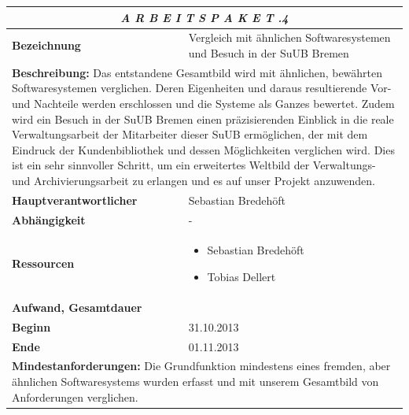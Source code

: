 \documentclass[fontsize=12pt,paper=a4,twoside]{scrartcl}
\begin{document}
\begin{tabular}{p{7.5cm}|p{7.5cm}}\toprule
\multicolumn{2}{c}{\textbf{\textit{A R B E I T S P A K E T \quad 2.1.4}}} \\ \toprule \hline
\textbf{Bezeichnung} & Vergleich mit ähnlichen Softwaresystemen und Besuch in der SuUB Bremen\\\hline
\multicolumn{2}{p{15cm}}{\textbf{Beschreibung:} \newline 
Das entstandene Gesamtbild wird mit ähnlichen, bewährten Softwaresystemen verglichen. Deren Eigenheiten und daraus resultierende Vor- und Nachteile werden erschlossen und die Systeme als Ganzes bewertet. Zudem wird ein Besuch in der SuUB Bremen einen präzisierenden Einblick in die reale Verwaltungsarbeit der Mitarbeiter dieser SuUB ermöglichen, der mit dem Eindruck der Kundenbibliothek und dessen Möglichkeiten verglichen wird. Dies ist ein sehr sinnvoller Schritt, um ein erweitertes Weltbild der Verwaltungs- und Archivierungsarbeit zu erlangen und es auf unser Projekt anzuwenden.   }  \\\hline
\textbf{Hauptverantwortlicher} & Sebastian Bredehöft\\\hline
\textbf{Abhängigkeit} & -\\\hline
\textbf{Ressourcen} & \begin{itemize} 
\itemsep0pt
\item Sebastian Bredehöft
\item Tobias Dellert
\end{itemize} \\\hline
\textbf{Aufwand, Gesamtdauer} & \\\hline
\textbf{Beginn} & 31.10.2013 \\\hline
\textbf{Ende} & 01.11.2013\\\hline
\multicolumn{2}{p{15cm}}{\textbf{Mindestanforderungen: } \newline
Die Grundfunktion mindestens eines fremden, aber ähnlichen Softwaresystems wurden erfasst und mit unserem Gesamtbild von Anforderungen verglichen. }  \\ \toprule
\end{tabular} \\\\
\end{document}
